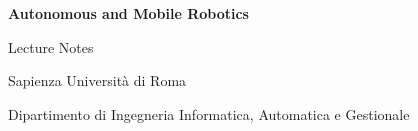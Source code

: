 \makeatletter
\begin{titlepage}
    \centering
    \vspace*{2cm}
    {\Huge\bfseries Autonomous and Mobile Robotics\par}
    \vspace{1cm}
    {\Large Lecture Notes \par}
    \vspace{2cm}
    {\large \@author\par}
    \vspace{0.5cm}
    {\large \@date\par}
    \vfill
    {\large Sapienza Università di Roma\par}
    {\large Dipartimento di Ingegneria Informatica, Automatica e Gestionale\par}
\end{titlepage}
\makeatother
